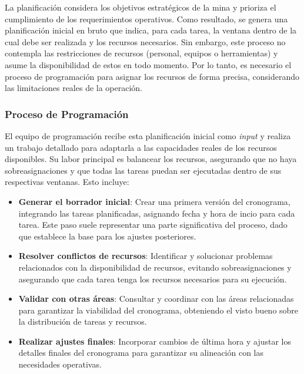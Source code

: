 \documentclass{article}
\begin{document}
La planificación considera los objetivos estratégicos de la mina y prioriza el cumplimiento de los requerimientos operativos. Como resultado, se genera una planificación inicial en bruto que indica, para cada tarea, la ventana dentro de la cual debe ser realizada y los recursos necesarios. Sin embargo, este proceso no contempla las restricciones de recursos (personal, equipos o herramientas) y asume la disponibilidad de estos en todo momento. Por lo tanto, es necesario el proceso de programación para asignar los recursos de forma precisa, considerando las limitaciones reales de la operación.

\subsubsection{Proceso de Programación}

El equipo de programación recibe esta planificación inicial como \textit{input} y realiza un trabajo detallado para adaptarla a las capacidades reales de los recursos disponibles. Su labor principal es balancear los recursos, asegurando que no haya sobreasignaciones y que todas las tareas puedan ser ejecutadas dentro de sus respectivas ventanas. Esto incluye:

\begin{itemize}
    \item \textbf{Generar el borrador inicial}: Crear una primera versión del cronograma, integrando las tareas planificadas, asignando fecha y hora de incio para cada tarea. Este paso suele representar una parte significativa del proceso, dado que establece la base para los ajustes posteriores.
    \item \textbf{Resolver conflictos de recursos}: Identificar y solucionar problemas relacionados con la disponibilidad de recursos, evitando sobreasignaciones y asegurando que cada tarea tenga los recursos necesarios para su ejecución.
    \item \textbf{Validar con otras áreas}: Consultar y coordinar con las áreas relacionadas para garantizar la viabilidad del cronograma, obteniendo el visto bueno sobre la distribución de tareas y recursos.
    \item \textbf{Realizar ajustes finales}: Incorporar cambios de última hora y ajustar los detalles finales del cronograma para garantizar su alineación con las necesidades operativas.
\end{itemize}
\end{document}
